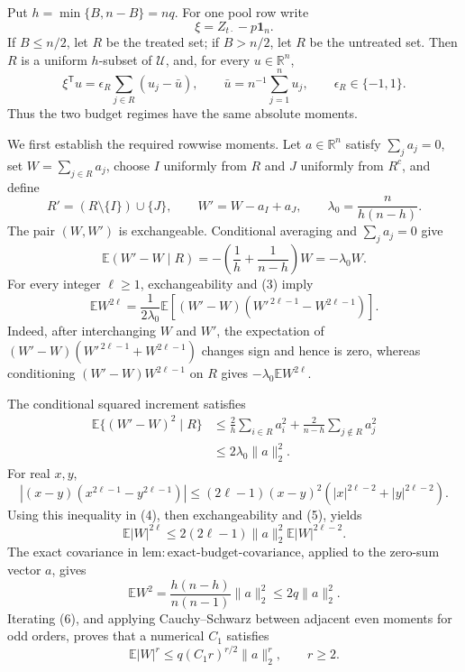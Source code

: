 Put \(h=\min\{B,n-B\}=nq\).  For one pool row write
\[
 \xi=Z_{t\cdot}-p\mathbf 1_n.
\]
If \(B\le n/2\), let \(R\) be the treated set; if \(B>n/2\), let \(R\) be the untreated set.  Then \(R\) is a uniform \(h\)-subset of \(\mathcal U\), and, for every \(u\in\mathbb R^n\),
\[
 \xi^{\mathsf T}u=\epsilon_R\sum_{j\in R}(u_j-\bar u),
 \qquad
 \bar u=n^{-1}\sum_{j=1}^n u_j,
 \qquad
 \epsilon_R\in\{-1,1\}.
 \tag{1}
\]
Thus the two budget regimes have the same absolute moments.

We first establish the required rowwise moments.  Let \(a\in\mathbb R^n\) satisfy \(\sum_j a_j=0\), set \(W=\sum_{j\in R}a_j\), choose \(I\) uniformly from \(R\) and \(J\) uniformly from \(R^c\), and define
\[
 R'=(R\setminus\{I\})\cup\{J\},
 \qquad W'=W-a_I+a_J,
 \qquad \lambda_0=\frac{n}{h(n-h)}.
 \tag{2}
\]
The pair \((W,W')\) is exchangeable.  Conditional averaging and \(\sum_j a_j=0\) give
\[
 \mathbb E(W'-W\mid R)
 =-\left(\frac1h+\frac1{n-h}\right)W
 =-\lambda_0W.
 \tag{3}
\]
For every integer \(\ell\ge1\), exchangeability and (3) imply
\[
 \mathbb EW^{2\ell}
 =\frac1{2\lambda_0}\mathbb E\!\left[(W'-W)
       (W'^{\,2\ell-1}-W^{2\ell-1})\right].
 \tag{4}
\]
Indeed, after interchanging \(W\) and \(W'\), the expectation of
\((W'-W)(W'^{\,2\ell-1}+W^{2\ell-1})\) changes sign and hence is zero, whereas conditioning \((W'-W)W^{2\ell-1}\) on \(R\) gives \(-\lambda_0\mathbb EW^{2\ell}\).

The conditional squared increment satisfies
\[
 \begin{aligned}
 \mathbb E\{(W'-W)^2\mid R\}
 &\le \frac2h\sum_{i\in R}a_i^2
      +\frac2{n-h}\sum_{j\notin R}a_j^2\\
 &\le2\lambda_0\lVert a\rVert_2^2.
 \end{aligned}
 \tag{5}
\]
For real \(x,y\),
\[
 |(x-y)(x^{2\ell-1}-y^{2\ell-1})|
 \le(2\ell-1)(x-y)^2
       (|x|^{2\ell-2}+|y|^{2\ell-2}).
\]
Using this inequality in (4), then exchangeability and (5), yields
\[
 \mathbb E|W|^{2\ell}
 \le2(2\ell-1)\lVert a\rVert_2^2
       \mathbb E|W|^{2\ell-2}.
 \tag{6}
\]
The exact covariance in \(\mathrm{lem{:}exact\text{-}budget\text{-}covariance}\), applied to the zero-sum vector \(a\), gives
\[
 \mathbb EW^2=\frac{h(n-h)}{n(n-1)}\lVert a\rVert_2^2
 \le2q\lVert a\rVert_2^2.
\]
Iterating (6), and applying Cauchy--Schwarz between adjacent even moments for odd orders, proves that a numerical \(C_1\) satisfies
\[
 \mathbb E|W|^r\le q(C_1r)^{r/2}\lVert a\rVert_2^r,
 \qquad r\ge2.
 \tag{7}
\]

